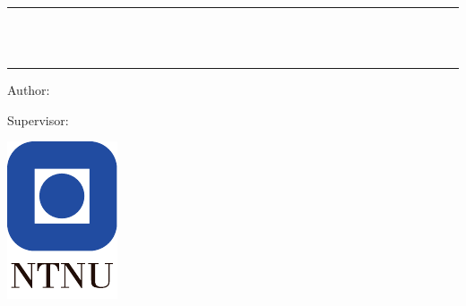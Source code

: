 %
%

\thispagestyle{empty}

\vspace{5em}

\begin{center}
{
	\sffamily
	\bfseries
	\huge
	\rule{\linewidth}{0.5mm}
	\\[0.5em]
	\thetitle
	\\[0.5em]
	\rule{\linewidth}{0.5mm}
}
\end{center}

\vspace{1em}

{
\centering
\begin{minipage}{0.5\textwidth}
{
        \begin{flushleft}
        \sffamily
        \Large
        Author:\\
        \LARGE
	\theauthor
        \end{flushleft}
}
\end{minipage}
\begin{minipage}{0.5\textwidth}
{
        \begin{flushright}
        \sffamily
        \Large
        Supervisor:\\
        \LARGE
	\thesupervisor
        \end{flushright}
}
\end{minipage}
}

\vfill

\begin{center}
        \includegraphics{fig/ntnu.pdf}
\end{center}


